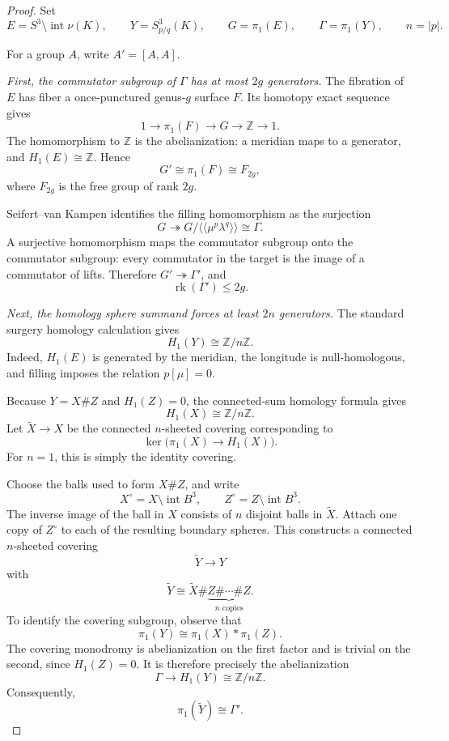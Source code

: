 \documentclass[11pt]{article}
\newcommand{\Z}{\mathbb{Z}}
\newcommand{\surg}[2]{S^3_{#1}(#2)}
\DeclareMathOperator{\rk}{rk}
\DeclareMathOperator{\intt}{int}
\begin{document}
\begin{proof}
Set
\[
    E=S^3\setminus\intt\nu(K),\qquad
    Y=\surg{p/q}{K},\qquad
    G=\pi_1(E),\qquad
    \Gamma=\pi_1(Y),\qquad
    n=|p|.
\]

For a group \(A\), write \(A'=[A,A]\).

\medskip
\noindent\emph{First, the commutator subgroup of \(\Gamma\) has at most
\(2g\) generators.}
The fibration of \(E\) has fiber a once-punctured genus-\(g\) surface
\(F\). Its homotopy exact sequence gives
\[
    1\longrightarrow\pi_1(F)
      \longrightarrow G
      \longrightarrow\Z
      \longrightarrow 1.
\]
The homomorphism to \(\Z\) is the abelianization: a meridian maps to a
generator, and \(H_1(E)\cong\Z\). Hence
\[
    G'\cong\pi_1(F)\cong F_{2g},
\]
where \(F_{2g}\) is the free group of rank \(2g\).

Seifert--van Kampen identifies the filling homomorphism as the
surjection
\[
    G\twoheadrightarrow
    G/\langle\!\langle\mu^p\lambda^q\rangle\!\rangle
    \cong\Gamma.
\]
A surjective homomorphism maps the commutator subgroup onto the
commutator subgroup: every commutator in the target is the image of
a commutator of lifts.
Therefore \(G'\twoheadrightarrow\Gamma'\),
and
\begin{equation}\label{eq:upper-rank}
    \rk(\Gamma')\leq 2g.
\end{equation}

\medskip
\noindent\emph{Next, the homology sphere summand forces at least \(2n\)
generators.}
The standard surgery homology calculation gives
\begin{equation}\label{eq:surgery-homology}
    H_1(Y)\cong\Z/n\Z.
\end{equation}
Indeed, \(H_1(E)\) is generated by the meridian, the longitude is
null-homologous, and filling imposes the relation \(p[\mu]=0\).

Because \(Y=X\# Z\) and \(H_1(Z)=0\), the connected-sum homology
formula gives
\[
    H_1(X)\cong\Z/n\Z.
\]
Let \(\widetilde X\to X\) be the connected \(n\)-sheeted covering
corresponding to
\[
    \ker\bigl(\pi_1(X)\longrightarrow H_1(X)\bigr).
\]
For \(n=1\), this is simply the identity covering.

Choose the balls used to form \(X\# Z\), and write
\[
    X^\circ=X\setminus\intt B^3,\qquad
    Z^\circ=Z\setminus\intt B^3.
\]
The inverse image of the ball in \(X\) consists of \(n\) disjoint
balls in \(\widetilde X\). Attach one copy of \(Z^\circ\) to each of
the resulting boundary spheres. This constructs a connected
\(n\)-sheeted covering
\[
    \widetilde Y\longrightarrow Y
\]
with
\begin{equation}\label{eq:cover-sum}
    \widetilde Y\cong
    \widetilde X\#
    \underbrace{Z\#\cdots\# Z}_{n\text{ copies}}.
\end{equation}
To identify the covering subgroup, observe that
\[
    \pi_1(Y)\cong\pi_1(X)*\pi_1(Z).
\]
The covering monodromy is abelianization on the first factor and is
trivial on the second, since \(H_1(Z)=0\). 
It is therefore precisely
the abelianization
\[
    \Gamma\longrightarrow H_1(Y)\cong\Z/n\Z.
\]
Consequently,
\[
    \pi_1(\widetilde Y)\cong\Gamma'.
\]


\end{proof}
\end{document}
